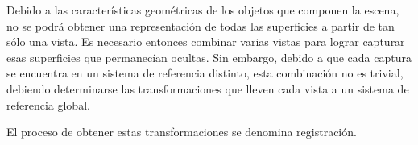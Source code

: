 Debido a las características geométricas de los objetos que componen la escena,
no se podrá obtener una representación de todas las superficies a partir de tan sólo
una vista. Es necesario entonces combinar varias vistas para lograr capturar
esas superficies que permanecían ocultas. Sin embargo, debido a que
cada captura se encuentra en un sistema de referencia distinto,
esta combinación no es trivial, debiendo determinarse las transformaciones que lleven
cada vista a un sistema de referencia global.

El proceso de obtener estas transformaciones se denomina registración.
